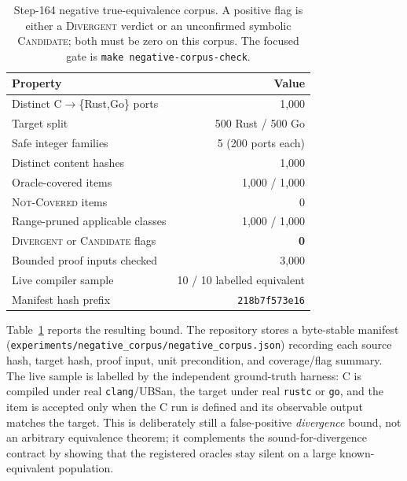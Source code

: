 \documentclass[10pt,a4paper]{article}
\begin{document}
\begin{table}[t]
\centering
\small
\caption{Step-164 negative true-equivalence corpus.  A positive flag is either a
\textsc{Divergent} verdict or an unconfirmed symbolic \textsc{Candidate}; both
must be zero on this corpus.  The focused gate is
\texttt{make negative-corpus-check}.}
\label{tab:negative-corpus}
\begin{tabular}{@{}lr@{}}
\toprule
Property & Value \\
\midrule
Distinct C$\to$\{Rust,Go\} ports & 1{,}000 \\
Target split & 500 Rust / 500 Go \\
Safe integer families & 5 (200 ports each) \\
Distinct content hashes & 1{,}000 \\
Oracle-covered items & 1{,}000 / 1{,}000 \\
\textsc{Not-Covered} items & 0 \\
Range-pruned applicable classes & 1{,}000 / 1{,}000 \\
\textsc{Divergent} or \textsc{Candidate} flags & \textbf{0} \\
Bounded proof inputs checked & 3{,}000 \\
Live compiler sample & 10 / 10 labelled equivalent \\
Manifest hash prefix & \texttt{218b7f573e16} \\
\bottomrule
\end{tabular}
\end{table}

Table~\ref{tab:negative-corpus} reports the resulting bound.  The repository
stores a byte-stable manifest
(\texttt{experiments/negative\_corpus/negative\_corpus.json}) recording each
source hash, target hash, proof input, unit precondition, and coverage/flag
summary.  The live sample is labelled by the independent ground-truth harness:
C is compiled under real \texttt{clang}/UBSan, the target under real
\texttt{rustc} or \texttt{go}, and the item is accepted only when the C run is
defined and its observable output matches the target.  This is deliberately still
a false-positive \emph{divergence} bound, not an arbitrary equivalence theorem;
it complements the sound-for-divergence contract by showing that the registered
oracles stay silent on a large known-equivalent population.
\end{document}
